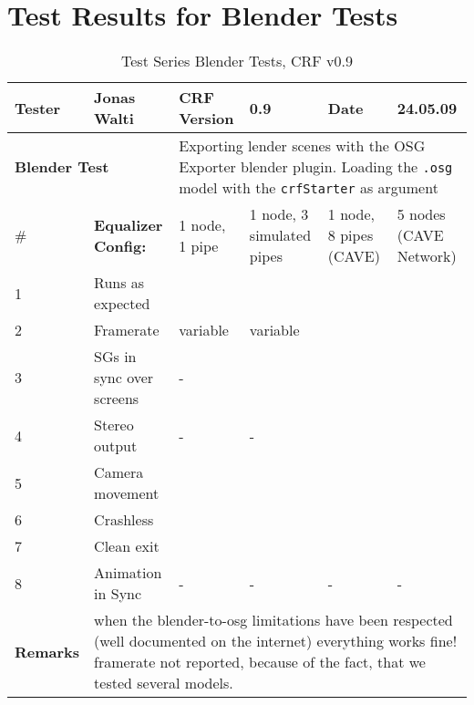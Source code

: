 \section{Test Results for Blender Tests}
\begin{table}[H]
	\centering
	\begin{tabular}{|b{}|b{}|m{}|m{}|m{}|m{}|}
		\hline
		\bfseries Tester & Jonas Walti & \bfseries CRF Version & 0.9 & \bfseries Date & 24.05.09 \\
		\hline
		\hline
		\multicolumn{2}{|l|}{\large{\bfseries Blender Test}} & \multicolumn{4}{p{0.6\textwidth}|}{Exporting lender scenes with the OSG Exporter blender plugin. Loading the \texttt{.osg} model with the \texttt{crfStarter} as argument} \\
		\hline
		\hline
		\# & \bfseries Equalizer Config: & 1 node, 1 pipe & 1 node, 3 simulated pipes &  1 node, 8 pipes (CAVE) &  5 nodes (CAVE Network) \\
		\hline 1 & Runs as expected & \tick & \tick & \tick & \tick \\
		\hline 2 & Framerate & variable & variable & \quad\quad 60 & \quad\quad 270 \\
		\hline 3 & SGs in sync over screens & \quad\quad- & \tick & \tick & \tick \\
		\hline 4 & Stereo output & \quad\quad- & \quad\quad- & \tick & \tick \\
		\hline 5 & Camera movement & \tick & \tick & \tick & \tick \\
		\hline 6 & Crashless & \tick & \tick & \tick & \tick \\
		\hline 7 & Clean exit & \tick & \tick & \tick & \tick \\
		\hline 8 & Animation in Sync & \quad\quad- & \quad\quad- & \quad\quad- & \quad\quad- \\
		\hline
		\hline \bfseries Remarks & \multicolumn{5}{p{0.85\textwidth}|}{when the blender-to-osg limitations have been respected (well documented on the internet) everything works fine! framerate not reported, because of the fact, that we tested several models.}\\
		\hline
	\end{tabular}
	\caption{Test Series Blender Tests, CRF v0.9}
\end{table}

